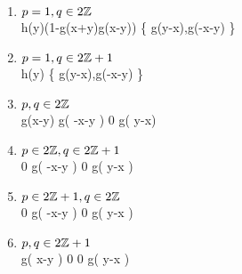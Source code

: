 \begin{enumerate}[(1)]
	\item $p=1,q\in2\mathbb{Z}$\\
\hspace*{0cm}\commonShift\mytableThreeTwo	%
{}		{\yimyStack}
{\yipx}			{h(y)(1-g(x+y)g(x-y))}
{\yimx}			{\max\left\{ g(y-x),g(-x-y) \right\}}
	\item $p=1,q\in2\mathbb{Z}+1$\\
\hspace*{0cm}\commonShift\mytableThreeTwo	%
{}		{}
{\yipx}			{h(y)}
{\yimx}			{\max\left\{ g(y-x),g(-x-y) \right\}}
	\item $p,q\in2\mathbb{Z}$\\
\hspace*{-0cm}\commonShift\mytable	%
{}	{\yipy}					{\yimy}
{\yipx}	{g\kern-0.05cm\left({x-y}\right)} 	{g\kern-0.05cm\left( {-x-y} \right)}
{\yipx}	{0} 					{g\kern-0.05cm\left( {y-x}\right)}
\item $p\in2\mathbb{Z},q\in2\mathbb{Z}+1$\\
\commonShift\mytable	%
{}	{\yipy}	{\yimy}
{\yipx} {0}	{g\kern-0.05cm\left( {-x-y} \right)}
{\yimx} {0} 	{g\kern-0.05cm\left( {y-x} \right)}
\item $p\in2\mathbb{Z}+1,q\in2\mathbb{Z}$\\
\commonShift\mytable	%
{}		{\yipy}		{\yimy}
{\yipx}		{0} 		{g\kern-0.05cm\left( {-x-y} \right)}	
{\yimx} 	{0} 		{g\kern-0.05cm\left( {y-x} \right)}
\item $p,q\in2\mathbb{Z}+1$\\
\commonShift\mytable	%
{}		{\yipy}							{\yimy}
{{\yipx}}	{g\kern-0.05cm\left( {x-y} \right)}			{0}
{{\yimx}}	{0}							{g\kern-0.05cm\left( {y-x} \right)}	
\end{enumerate}
